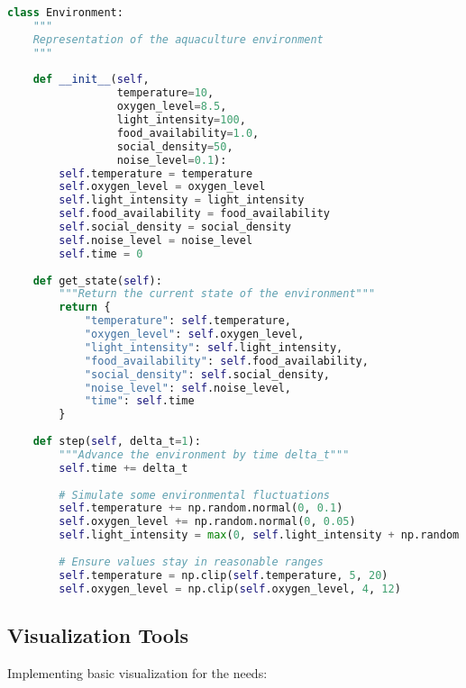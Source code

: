 \documentclass[11pt,a4paper]{article}
\begin{document}
\begin{lstlisting}[language=Python]
class Environment:
    """
    Representation of the aquaculture environment
    """
    
    def __init__(self, 
                 temperature=10, 
                 oxygen_level=8.5,
                 light_intensity=100,
                 food_availability=1.0,
                 social_density=50,
                 noise_level=0.1):
        self.temperature = temperature
        self.oxygen_level = oxygen_level
        self.light_intensity = light_intensity
        self.food_availability = food_availability
        self.social_density = social_density
        self.noise_level = noise_level
        self.time = 0
        
    def get_state(self):
        """Return the current state of the environment"""
        return {
            "temperature": self.temperature,
            "oxygen_level": self.oxygen_level,
            "light_intensity": self.light_intensity,
            "food_availability": self.food_availability,
            "social_density": self.social_density,
            "noise_level": self.noise_level,
            "time": self.time
        }
        
    def step(self, delta_t=1):
        """Advance the environment by time delta_t"""
        self.time += delta_t
        
        # Simulate some environmental fluctuations
        self.temperature += np.random.normal(0, 0.1)
        self.oxygen_level += np.random.normal(0, 0.05)
        self.light_intensity = max(0, self.light_intensity + np.random.normal(0, 5))
        
        # Ensure values stay in reasonable ranges
        self.temperature = np.clip(self.temperature, 5, 20)
        self.oxygen_level = np.clip(self.oxygen_level, 4, 12)
\end{lstlisting}

\subsection{Visualization Tools}
Implementing basic visualization for the needs:
\end{document}
